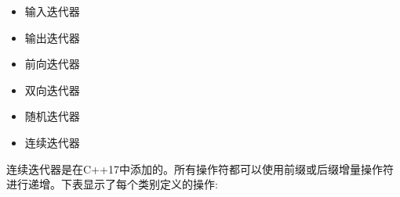\begin{itemize}
\item
输入迭代器

\item
输出迭代器

\item
前向迭代器

\item
双向迭代器

\item
随机迭代器

\item
连续迭代器
\end{itemize}

连续迭代器是在C++17中添加的。所有操作符都可以使用前缀或后缀增量操作符进行递增。下表显示了每个类别定义的操作:


